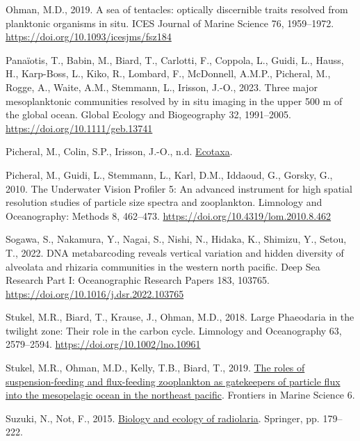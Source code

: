 \documentclass[
]{article}
\newlength{\cslhangindent}
\newenvironment{CSLReferences}[2] %
 {\begin{list}{}{%
  \setlength{\itemindent}{0pt}
  \setlength{\leftmargin}{0pt}
  \setlength{\parsep}{0pt}
  \ifodd #1
   \setlength{\leftmargin}{\cslhangindent}
   \setlength{\itemindent}{-1\cslhangindent}
  \fi
  \setlength{\itemsep}{#2\baselineskip}}}
 {\end{list}}
\begin{document}
\begin{CSLReferences}{1}{0}
Ohman, M.D., 2019. A sea of tentacles: optically discernible traits
resolved from planktonic organisms in situ. ICES Journal of Marine
Science 76, 1959--1972. \url{https://doi.org/10.1093/icesjms/fsz184}

Panaïotis, T., Babin, M., Biard, T., Carlotti, F., Coppola, L., Guidi,
L., Hauss, H., Karp-Boss, L., Kiko, R., Lombard, F., McDonnell, A.M.P.,
Picheral, M., Rogge, A., Waite, A.M., Stemmann, L., Irisson, J.-O.,
2023. Three major mesoplanktonic communities resolved by in situ imaging
in the upper 500 m of the global ocean. Global Ecology and Biogeography
32, 1991--2005. \url{https://doi.org/10.1111/geb.13741}

Picheral, M., Colin, S.P., Irisson, J.-O., n.d.
\href{https://ecotaxa.obs-vlfr.fr/}{Ecotaxa}.

Picheral, M., Guidi, L., Stemmann, L., Karl, D.M., Iddaoud, G., Gorsky,
G., 2010. The Underwater Vision Profiler 5: An advanced instrument for
high spatial resolution studies of particle size spectra and
zooplankton. Limnology and Oceanography: Methods 8, 462--473.
\url{https://doi.org/10.4319/lom.2010.8.462}

Sogawa, S., Nakamura, Y., Nagai, S., Nishi, N., Hidaka, K., Shimizu, Y.,
Setou, T., 2022. DNA metabarcoding reveals vertical variation and hidden
diversity of alveolata and rhizaria communities in the western north
pacific. Deep Sea Research Part I: Oceanographic Research Papers 183,
103765. \url{https://doi.org/10.1016/j.dsr.2022.103765}

Stukel, M.R., Biard, T., Krause, J., Ohman, M.D., 2018. Large Phaeodaria
in the twilight zone: Their role in the carbon cycle. Limnology and
Oceanography 63, 2579--2594. \url{https://doi.org/10.1002/lno.10961}

Stukel, M.R., Ohman, M.D., Kelly, T.B., Biard, T., 2019.
\href{https://www.frontiersin.org/articles/10.3389/fmars.2019.00397}{The
roles of suspension-feeding and flux-feeding zooplankton as gatekeepers
of particle flux into the mesopelagic ocean in the northeast pacific}.
Frontiers in Marine Science 6.

Suzuki, N., Not, F., 2015.
\href{https://link.springer.com/chapter/10.1007/978-4-431-55130-0_8}{Biology
and ecology of radiolaria}. Springer, pp. 179--222.


\end{CSLReferences}
\end{document}
